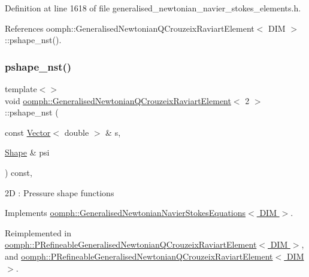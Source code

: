 Definition at line 1618 of file generalised\+\_\+newtonian\+\_\+navier\+\_\+stokes\+\_\+elements.\+h.



References oomph\+::\+Generalised\+Newtonian\+Q\+Crouzeix\+Raviart\+Element$<$ D\+I\+M $>$\+::pshape\+\_\+nst().

\mbox{\label{classoomph_1_1GeneralisedNewtonianQCrouzeixRaviartElement_a9a7743f0db402afea8f792cc6cc8ea49}} 
\subsubsection{\texorpdfstring{pshape\+\_\+nst()}{pshape\_nst()}\hspace{0.1cm}{\footnotesize\ttfamily [3/4]}}
{\footnotesize\ttfamily template$<$$>$ \\
void \hyperlink{classoomph_1_1GeneralisedNewtonianQCrouzeixRaviartElement}{oomph\+::\+Generalised\+Newtonian\+Q\+Crouzeix\+Raviart\+Element}$<$ 2 $>$\+::pshape\+\_\+nst (\begin{DoxyParamCaption}\item[{const \hyperlink{classoomph_1_1Vector}{Vector}$<$ double $>$ \&}]{s,  }\item[{\hyperlink{classoomph_1_1Shape}{Shape} \&}]{psi }\end{DoxyParamCaption}) const\hspace{0.3cm}{\ttfamily [inline]}, {\ttfamily [virtual]}}

2D \+: Pressure shape functions 

Implements \hyperlink{classoomph_1_1GeneralisedNewtonianNavierStokesEquations_a84735d21f3d1ade819726a71a7b462e1}{oomph\+::\+Generalised\+Newtonian\+Navier\+Stokes\+Equations$<$ D\+I\+M $>$}.



Reimplemented in \hyperlink{classoomph_1_1PRefineableGeneralisedNewtonianQCrouzeixRaviartElement_a80e3fffb08dc9228fae0535d15cbc096}{oomph\+::\+P\+Refineable\+Generalised\+Newtonian\+Q\+Crouzeix\+Raviart\+Element$<$ D\+I\+M $>$}, and \hyperlink{classoomph_1_1PRefineableGeneralisedNewtonianQCrouzeixRaviartElement_a663ff5b7e858c491d8d77649ca555781}{oomph\+::\+P\+Refineable\+Generalised\+Newtonian\+Q\+Crouzeix\+Raviart\+Element$<$ D\+I\+M $>$}.




